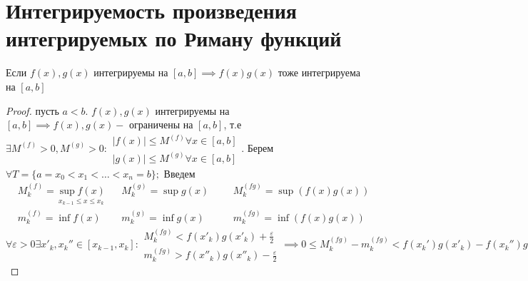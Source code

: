 \documentclass[../main.tex]{subfiles}
\begin{document}
\section{Интегрируемость произведения интегрируемых по Риману функций}
\begin{theorem}
    Если $f(x),g(x)$ интегрируемы на $[a,b]\implies f(x)g(x)$ тоже интегрируема на $[a,b]$
\end{theorem}
\begin{proof}
    пусть $a<b$.
    $f(x),g(x)$ интегрируемы на $[a,b]\implies f(x),g(x) - \text{ ограничены на }[a,b]$, т.е $\exists M^{(f)}>0,M^{(g)}>0: \begin{aligned}
        |f(x)|\leqslant M^{(f)} \forall x\in[a,b] \\ 
        |g(x)|\leqslant M^{(g)} \forall x\in[a,b]
    \end{aligned}$. Берем $\forall T=\{a=x_{0}<x_{1}<\dots<x_{n}=b\};$ Введем $\begin{aligned}&M_{k}^{(f)}=\underset{x_{k-1}\leqslant x\leqslant x_{k}}{\sup f(x)} &&M_{k}^{(g)}=\sup g(x) &&&M_{k}^{(fg)}=\sup (f(x)g(x))\\ &m_{k}^{(f)}=\inf f(x)
    &&m_{k}^{(g)}=\inf g(x) &&&m_{k}^{(fg)}=\inf (f(x)g(x))\end{aligned}$\\
    $\forall \varepsilon>0 \exists x'_{k},x_{k}''\in[x_{k-1},x_{k}]:\begin{aligned}M_{k}^{(fg)}<f(x'_{k})g(x'_{k})+\frac{\varepsilon}{2}\\ m_{k}^{(fg)}>f(x''_{k})g(x''_{k})-\frac{\varepsilon}{2}\end{aligned}
    \implies 0\leqslant M_{k}^{(fg)}-m_{k}^{(fg)}<f(x_{k}')g(x'_{k})-f(x_{k}'')g(x_{k}'')+\varepsilon =f(x'_{k})g(x_{k}')+f(x'_{k})g(x_{k}'')-f(x'_{k})g(x_{k}'')-f(x_{k}'')g(x''_{k})+\varepsilon=f(x'_{k})(g(x_{k}')-g(x_{k}''))+g(x_{k}'')(f(x_{k}')-f(x_{k}''))+\varepsilon\leqslant M^{(f)}((M_{k})^{g}-m_{k}^{(g)}) +M^{(g)}(M_{k}^{(f)}-m_{k}^{(f)})+\varepsilon\implies 0\leqslant M_{k}^{(fg)}-m_{k}^{(fg)}\leqslant M^{(f)}((M_{k})^{g}-m_{k}^{(g)})+M^{(g)}(M^{(f)}_{k}-m_{k}^{f})\implies 0\leqslant S_{T}(fg)-s_{T}(fg)\leqslant M^{(f)}(S_{T}(g)-s_{T}(g))+M^{(g)}(S_{T}(f)-s_{T}(f))\implies \lim\limits_{\delta_{T}\to 0} (S_{T}(fg)-s_{T}(fg))=0\implies f(x)g(x) \text{ интегрируема на } [a,b] $ \\ 
     
\end{proof}
\end{document}

